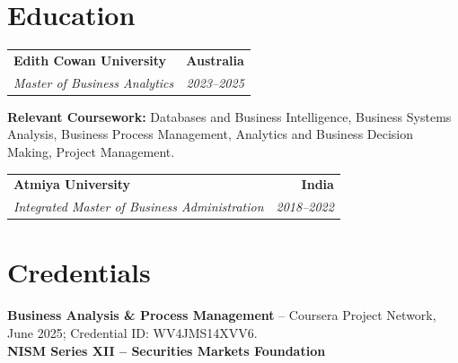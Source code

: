 \documentclass[letterpaper,10pt]{article}
\makeatletter
\newcommand{\role}[4]{%
  \begin{tabularx}{\textwidth}{@{}Xr@{}}
    \textbf{#1} & \textbf{#2} \\
    \textit{#3} & \textit{#4}
  \end{tabularx}\vspace{-1pt}
}
\makeatother
\begin{document}
\section{Education}
\role{Edith Cowan University}{Australia}{Master of Business Analytics}{2023--2025}
\small\textbf{Relevant Coursework:} Databases and Business Intelligence, Business Systems Analysis, Business Process Management, Analytics and Business Decision Making, Project Management.\\[2pt]
\role{Atmiya University}{India}{Integrated Master of Business Administration}{2018--2022}

\section{Credentials}
\small\textbf{Business Analysis \& Process Management} -- Coursera Project Network, June 2025; Credential ID: WV4JMS14XVV6.\\[-0.2pt]
\small\textbf{NISM Series XII -- Securities Markets Foundation}
\end{document}

